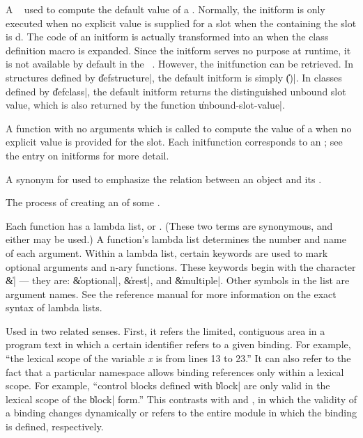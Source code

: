 \begin{description}
	{A \Talk\  used to compute the default value of a
	.  Normally, the initform is only executed when no
	explicit value is supplied for a slot when the 
	containing the slot is d.  The code of an
	initform is actually transformed into an 
	when the class definition macro is expanded.  Since the
	initform serves no purpose at runtime, it is not available by
	default in the \telos\ .  However,
	the initfunction can be retrieved.  In structures defined by
	\|defstructure|, the default initform is simply \|()|.  In
	classes defined by \|defclass|, the default initform returns
	the distinguished unbound slot value, which is also returned
	by the function \|unbound-slot-value|.}

	{A function with no arguments which is called to compute the
	value of a  when no explicit value is provided for
	the slot.  Each initfunction corresponds to an
	; see the entry on initforms for more detail.}

	{A synonym for  used to emphasize the relation
	between an object and its .}

	{The process of creating an  of some
	.}

	{Each function has a lambda list, or .
	(These two terms are synonymous, and either may be used.)  A
	function's lambda list determines the number and name of each
	argument.  Within a lambda list, certain keywords are used to
	mark optional arguments and n-ary functions.  These keywords
	begin with the character \|\&| --- they are: \|\&optional|,
	\|\&rest|, and \|\&multiple|.  Other symbols in the list are
	argument names.  See the reference manual for more information
	on the exact syntax of lambda lists.}

	{Used in two related senses.  First, it refers the limited,
	contiguous area in a program text in which a certain
	identifier refers to a given binding.  For example, ``the
	lexical scope of the variable {\em x} is from lines 13 to
	23.''  It can also refer to the fact that a particular
	namespace allows binding references only within a lexical
	scope.  For example, ``control blocks defined with \|block|
	are only valid in the lexical scope of the \|block| form.''
	This contrasts with  and , in which the validity of a binding changes dynamically
	or refers to the entire module in which the binding is
	defined, respectively.}


\end{description}
